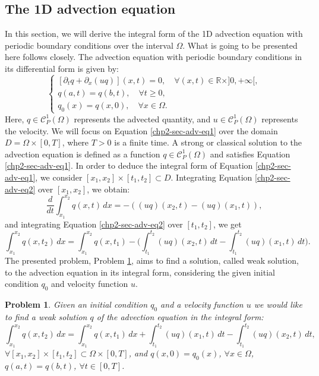 \subsection{The 1D advection equation}
In this section, we will derive the integral form of the 1D advection equation with periodic boundary conditions over the interval $\Omega$.
What is going to be presented here follows \citet{leveque:1990,leveque:2002} closely.
The advection equation with periodic boundary conditions in its differential form is given by:
\begin{equation}
	\label{chp2-sec-adv-eq1}
	\begin{cases}
		[{\partial_t q} + {\partial_x (uq)}](x, t)
		= 0, \quad \forall (x,t) \in \mathbb{R}\times ]0, +\infty[,\\
		{q}(a, t) = {q}(b, t), \quad \forall t\geq 0,\\
		q_0(x) = q(x,0), \quad \forall x \in \Omega.
	\end{cases}
\end{equation}
Here, $q \in \mathcal{C}_P^1{(\Omega)}$ represents the advected quantity, and $u \in \mathcal{C}_P^1{(\Omega)}$ represents the velocity.
We will focus on Equation \eqref{chp2-sec-adv-eq1} over the domain $D = \Omega\times[0,T]$, where $T>0$ is a finite time.
A strong or classical solution to the advection equation is defined as a function ${q}\in\mathcal{C}^1_P(\Omega)$ 
and satisfies Equation \eqref{chp2-sec-adv-eq1}.
In order to deduce the integral form of Equation \eqref{chp2-sec-adv-eq1}, we consider
$[x_1, x_2]\times[t_1,t_2]\subset D$. 
Integrating Equation \eqref{chp2-sec-adv-eq2} over $[x_1, x_2]$, we obtain:
\begin{equation}
    \label{chp2-sec-adv-eq2}
	\frac{d}{dt} \int_{x_1}^{x_2} q(x,t) \,dx =  
	-({(uq)}(x_2,t) - {(uq)}(x_1,t)) ,
\end{equation}
and integrating Equation \eqref{chp2-sec-adv-eq2} over $[t_1,t_2]$, we get
\begin{equation}
    \label{chp2-sec-adv-eq3}
    \int_{x_1}^{x_2} q(x,t_2) \,dx=  \int_{x_1}^{x_2} q(x,t_1)
	-\bigg( \int_{t_1}^{t_2} 
	{(uq)}(x_2, t) \,dt - 
	\int_{t_1}^{t_2}{(uq)}(x_1, t) \,dt \bigg).
\end{equation}
The presented problem, Problem \ref{chp2-sec2-prob1}, aims to find a solution, called weak solution, to the advection equation
in its integral form, considering the given initial condition ${q}_0$ and velocity function $u$.
\theoremstyle{plain} 
\newtheorem{prob}{Problem}[chapter]
\begin{prob}
	\label{chp2-sec2-prob1}
	Given an initial condition ${q}_0$ and a velocity function $u$  we would like to find a weak solution ${q}$
	of the advection equation in the integral form:
	\begin{equation*}
	        \int_{x_1}^{x_2} {q}(x, t_2) \,dx = 
       		\int_{x_1}^{x_2} {q}(x, t_1) \,dx + 
        	\int_{t_1}^{t_2} {(uq)}(x_1, t) \,dt -
		\int_{t_1}^{t_2}{(uq)}(x_2, t) \,dt ,
	\end{equation*}
	$\forall [x_1, x_2]\times[t_1, t_2] \subset \Omega \times [0,T]$, 
	and
	${q}(x,0) = {q}_0(x)$, $\forall x \in \Omega$, $q(a,t)=q(b,t)$, $\forall t \in [0,T]$.
\end{prob}
